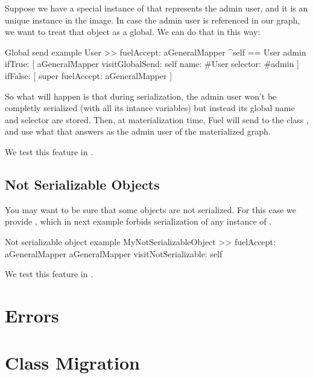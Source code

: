 \documentclass[a4paper,10pt,twoside]{book}
\begin{document}
Suppose we have a special instance of  that represents the admin user, and it is an unique instance in the image. In case the admin user is referenced in our graph, we want to treat that object as a global. We can do that in this way:

\begin{code}{Global send example}
User >> fuelAccept: aGeneralMapper
    ^self == User admin
        ifTrue: [ 
            aGeneralMapper 
                visitGlobalSend: self 
                name: #User 
                selector: #admin ]
        ifFalse: [ super fuelAccept: aGeneralMapper ]
\end{code}

So what will happen is that during serialization, the admin user won't be completly serialized (with all its intance variables) but instead its global name and selector are stored. Then, at materialization time, Fuel will send  to the class , and use what that answers as the admin user of the materialized graph. 

We test this feature in .


\subsection{Not Serializable Objects}

You may want to be sure that some objects are not serialized. For this case we provide , which in next example forbids serialization of any instance of .

\begin{code}{Not serializable object example}
MyNotSerializableObject >> fuelAccept: aGeneralMapper
    aGeneralMapper visitNotSerializable: self
\end{code}

We test this feature in .


\section{Errors}



\section{Class Migration}
\end{document}
